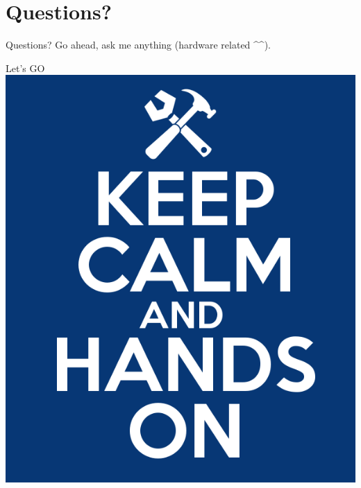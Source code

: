 \documentclass{beamer}
\begin{document}
\section{Questions?}

\begin{frame}{Questions?}
    Go ahead, ask me anything (hardware related \textasciicircum\textasciicircum).
\end{frame}

\begin{frame}{Let's GO}
    \centering
    \includegraphics[scale=0.25]{hands-on}
\end{frame}
\end{document}
